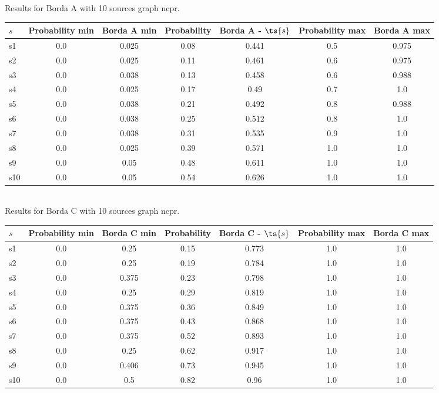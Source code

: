 \documentclass{article}
\begin{document}
\noindent Results for Borda A with 10 sources graph ncpr.

\noindent\begin{tabular}{|l|c|c|c|c|c|c|}
\hline
$s$& Probability min & Borda A min & Probability & Borda A - $\ts{s}$ & Probability max & Borda A max\\
\hline
s1 &0.0 & 0.025 & 0.08 & 0.441 & 0.5 & 0.975\\
\hline
s2 &0.0 & 0.025 & 0.11 & 0.461 & 0.6 & 0.975\\
\hline
s3 &0.0 & 0.038 & 0.13 & 0.458 & 0.6 & 0.988\\
\hline
s4 &0.0 & 0.025 & 0.17 & 0.49 & 0.7 & 1.0\\
\hline
s5 &0.0 & 0.038 & 0.21 & 0.492 & 0.8 & 0.988\\
\hline
s6 &0.0 & 0.038 & 0.25 & 0.512 & 0.8 & 1.0\\
\hline
s7 &0.0 & 0.038 & 0.31 & 0.535 & 0.9 & 1.0\\
\hline
s8 &0.0 & 0.025 & 0.39 & 0.571 & 1.0 & 1.0\\
\hline
s9 &0.0 & 0.05 & 0.48 & 0.611 & 1.0 & 1.0\\
\hline
s10 &0.0 & 0.05 & 0.54 & 0.626 & 1.0 & 1.0\\
\hline
\end{tabular}\\

\noindent Results for Borda C with 10 sources graph ncpr.

\noindent\begin{tabular}{|l|c|c|c|c|c|c|}
\hline
$s$& Probability min & Borda C min & Probability & Borda C - $\ts{s}$ & Probability max & Borda C max\\
\hline
s1 &0.0 & 0.25 & 0.15 & 0.773 & 1.0 & 1.0\\
\hline
s2 &0.0 & 0.25 & 0.19 & 0.784 & 1.0 & 1.0\\
\hline
s3 &0.0 & 0.375 & 0.23 & 0.798 & 1.0 & 1.0\\
\hline
s4 &0.0 & 0.25 & 0.29 & 0.819 & 1.0 & 1.0\\
\hline
s5 &0.0 & 0.375 & 0.36 & 0.849 & 1.0 & 1.0\\
\hline
s6 &0.0 & 0.375 & 0.43 & 0.868 & 1.0 & 1.0\\
\hline
s7 &0.0 & 0.375 & 0.52 & 0.893 & 1.0 & 1.0\\
\hline
s8 &0.0 & 0.25 & 0.62 & 0.917 & 1.0 & 1.0\\
\hline
s9 &0.0 & 0.406 & 0.73 & 0.945 & 1.0 & 1.0\\
\hline
s10 &0.0 & 0.5 & 0.82 & 0.96 & 1.0 & 1.0\\
\hline
\end{tabular}\\
\end{document}
